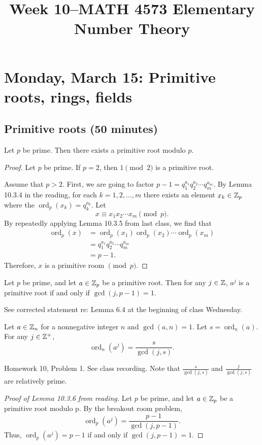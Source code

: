 \documentclass[letterpaper, 11 pt]{article}
\title{Week 10--MATH 4573 Elementary Number Theory}
\newcommand{\ord}{\operatorname{ord}}
\begin{document}
\maketitle
\tableofcontents
\section{Monday, March 15: Primitive roots, rings, fields}
\subsection{Primitive roots (50 minutes)}
\begin{thm}
 Let $p$ be prime. Then there exists a primitive root modulo $p$.
\end{thm}
\begin{proof}
 Let $p$ be prime. If $p=2$, then $1\pmod2$ is a primitive root.
 
 Assume that $p>2$. First, we are going to factor $p-1=q_1^{a_1}q_2^{a_2}\cdots q_m^{a_m}$. By Lemma 10.3.4 in the reading, for each $k=1,2,\dots,m$ there exists an element $x_k\in \mathbb Z_p$ where the $\ord_p(x_k)=q_k^{a_k}.$ Let \[x\equiv x_1 x_2 \cdots x_m \pmod p.\]
 By repeatedly applying Lemma 10.3.5 from last class, we find that 
 \begin{align*}
 \ord_p(x)&=  \ord_p(x_1) \ord_p( x_2 )\cdots  \ord_p(x_m )\\
 &=q_1^{a_1}q_2^{a_2}\cdots q_m^{a_m}\\
 &=p-1.
 \end{align*}
Therefore, $x$ is a primitive room $\pmod p$.
\end{proof}

\begin{lem}
 Let $p$ be prime, and let $a\in\mathbb Z_p$ be a primitive root. Then for any $j\in\mathbb Z$, $a^j$ is a primitive root if and only if $\gcd(j,p-1)=1$.
\end{lem}
See corrected statement re: Lemma 6.4 at the beginning of class Wednesday. 

\begin{br}[10 minutes]
Let $a\in\mathbb Z_n$ for a nonnegative integer $n$ and $\gcd(a,n)=1$. Let $s=\ord_n(a)$. For any $j\in\mathbb Z^+$, \[\ord_n(a^j)=\frac{s}{\gcd(j,s)}.\]
\end{br}
\begin{solution}
 Homework 10, Problem 1. See class recording. Note that $\frac{s}{\gcd(j,s)}$ and $\frac{j}{\gcd(j,s)}$ are relatively prime.
\end{solution}
\begin{proof}[Proof of Lemma 10.3.6 from reading]
 Let $p$ be prime, and let $a\in\mathbb Z_p$ be a primitive root modulo p. By the breakout room problem, 
 \[\ord_p(a^j)=\frac{p-1}{\gcd(j,p-1)}.\]
 Thus, $\ord_p(a^j)=p-1$ if and only if $\gcd(j,p-1)=1.$
\end{proof}
\end{document}
